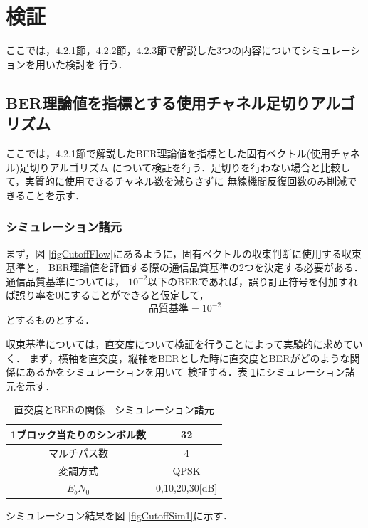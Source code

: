 \section{検証}
ここでは，4.2.1節，4.2.2節，4.2.3節で解説した3つの内容についてシミュレーションを用いた検討を
行う．

\subsection{BER理論値を指標とする使用チャネル足切りアルゴリズム}
ここでは，4.2.1節で解説したBER理論値を指標とした固有ベクトル(使用チャネル)足切りアルゴリズム
について検証を行う．足切りを行わない場合と比較して，実質的に使用できるチャネル数を減らさずに
無線機間反復回数のみ削減できることを示す．

\subsubsection{シミュレーション諸元}
まず，図 \ref{figCutoffFlow}にあるように，固有ベクトルの収束判断に使用する収束基準と，
BER理論値を評価する際の通信品質基準の2つを決定する必要がある．通信品質基準については，
$10^{-2}$以下のBERであれば，誤り訂正符号を付加すれば誤り率を0にすることができると仮定して，
\begin{equation}
    品質基準=10^{-2}
\end{equation}
とするものとする．

収束基準については，直交度について検証を行うことによって実験的に求めていく．
まず，横軸を直交度，縦軸をBERとした時に直交度とBERがどのような関係にあるかをシミュレーションを用いて
検証する．表 \ref{tabCutoff1}にシミュレーション諸元を示す．

\begin{table}[ht]
    \begin{tabular}{|c|c|} \hline
        1ブロック当たりのシンボル数 & 32 \\ \hline
        マルチパス数 & 4 \\ \hline
        変調方式 & QPSK \\ \hline
        $E_bN_0$ & 0,10,20,30[dB] \\ \hline
    \end{tabular}
    \centering
    \caption{直交度とBERの関係　シミュレーション諸元}
    \label{tabCutoff1}
\end{table}

シミュレーション結果を図 \ref{figCutoffSim1}に示す．

